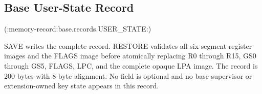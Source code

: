 \subsection{Base User-State Record}

(:memory-record:base.records.USER_STATE:)

SAVE writes the complete record. RESTORE validates all six segment-register images and the FLAGS image before atomically replacing R0 through R15, GS0 through GS5, FLAGS, LPC, and the complete opaque LPA image. The record is 200 bytes with 8-byte alignment. No field is optional and no base supervisor or extension-owned key state appears in this record.
